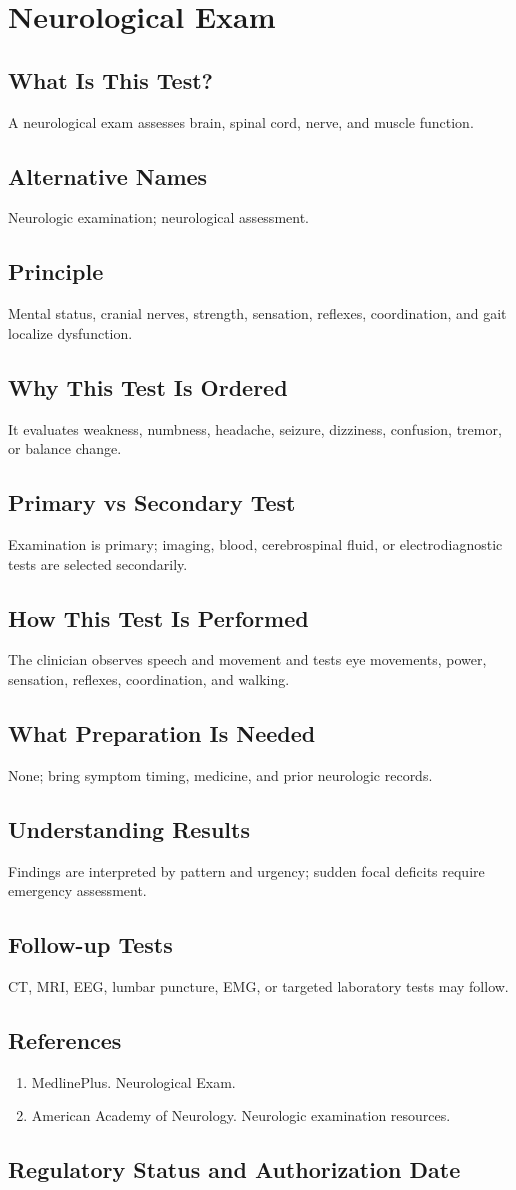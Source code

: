 \chapter{Neurological Exam}
\section*{What Is This Test?} A neurological exam assesses brain, spinal cord, nerve, and muscle function.\section*{Alternative Names} Neurologic examination; neurological assessment.\section*{Principle} Mental status, cranial nerves, strength, sensation, reflexes, coordination, and gait localize dysfunction.\section*{Why This Test Is Ordered} It evaluates weakness, numbness, headache, seizure, dizziness, confusion, tremor, or balance change.\section*{Primary vs Secondary Test} Examination is primary; imaging, blood, cerebrospinal fluid, or electrodiagnostic tests are selected secondarily.\section*{How This Test Is Performed} The clinician observes speech and movement and tests eye movements, power, sensation, reflexes, coordination, and walking.\section*{What Preparation Is Needed} None; bring symptom timing, medicine, and prior neurologic records.\section*{Understanding Results} Findings are interpreted by pattern and urgency; sudden focal deficits require emergency assessment.\section*{Follow-up Tests} CT, MRI, EEG, lumbar puncture, EMG, or targeted laboratory tests may follow.\section*{References} \begin{enumerate}\item MedlinePlus. Neurological Exam.\item American Academy of Neurology. Neurologic examination resources.\end{enumerate}\clearpage\section*{Regulatory Status and Authorization Date}\clearpage
